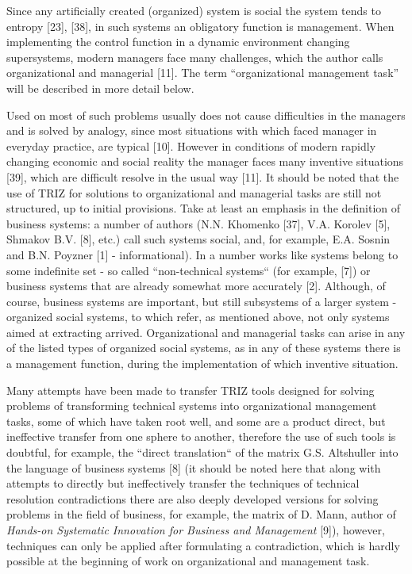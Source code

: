 \documentclass[11pt,a4paper]{book}
\begin{document}
Since any artificially created (organized) system is social the system tends
to entropy [23], [38], in such systems an obligatory function is management.
When implementing the control function in a dynamic environment changing
supersystems, modern managers face many challenges, which the author calls
organizational and managerial [11]. The term “organizational management task”
will be described in more detail below.

Used on most of such problems usually does not cause difficulties in the
managers and is solved by analogy, since most situations with which faced
manager in everyday practice, are typical [10]. However in conditions of
modern rapidly changing economic and social reality the manager faces many
inventive situations [39], which are difficult resolve in the usual way [11].
It should be noted that the use of TRIZ for solutions to organizational and
managerial tasks are still not structured, up to initial provisions. Take at
least an emphasis in the definition of business systems: a number of authors
(N.N. Khomenko [37], V.A. Korolev [5], Shmakov B.V. [8], etc.) call such
systems social, and, for example, E.A. Sosnin and B.N. Poyzner [1] -
informational).  In a number works like systems belong to some indefinite set
- so called “non-technical systems“ (for example, [7]) or business systems
that are already somewhat more accurately [2]. Although, of course, business
systems are important, but still subsystems of a larger system - organized
social systems, to which refer, as mentioned above, not only systems aimed at
extracting arrived. Organizational and managerial tasks can arise in any of
the listed types of organized social systems, as in any of these systems there
is a management function, during the implementation of which inventive
situation.

Many attempts have been made to transfer TRIZ tools designed for solving
problems of transforming technical systems into organizational management
tasks, some of which have taken root well, and some are a product direct, but
ineffective transfer from one sphere to another, therefore the use of such
tools is doubtful, for example, the “direct translation“ of the matrix
G.S. Altshuller into the language of business systems [8] (it should be noted
here that along with attempts to directly but ineffectively transfer the
techniques of technical resolution contradictions there are also deeply
developed versions for solving problems in the field of business, for example,
the matrix of D. Mann, author of \emph{Hands-on Systematic Innovation for
  Business and Management} [9]), however, techniques can only be applied after
formulating a contradiction, which is hardly possible at the beginning of work
on organizational and management task.
\end{document}
